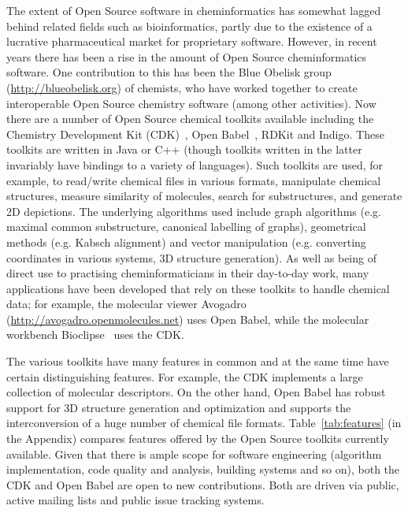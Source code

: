 \documentclass{sig-alternate}
\begin{document}
The extent of Open Source software in cheminformatics has somewhat
lagged behind related fields such as bioinformatics, partly due to the
existence of a lucrative pharmaceutical market for proprietary
software. However, in recent years there has been a rise in the amount
of Open Source cheminformatics software. One contribution to this has
been the Blue Obelisk group~\cite{BlueObelisk2011}
(\url{http://blueobelisk.org}) of chemists, who have worked together
to create interoperable Open Source chemistry software (among other
activities). Now there are a number of Open Source chemical toolkits
available including the Chemistry Development Kit
(CDK)~\cite{steinbeck2003}, Open Babel~\cite{openbabel2011}, RDKit and
Indigo. These toolkits are written in Java or C++ (though toolkits
written in the latter invariably have bindings to a variety of
languages). Such toolkits are used, for example, to read/write
chemical files in various formats, manipulate chemical structures, measure
similarity of molecules, search for substructures, and generate 2D
depictions. The underlying algorithms used include graph algorithms
(e.g. maximal common substructure, canonical labelling of graphs),
geometrical methods (e.g. Kabsch alignment) and vector manipulation
(e.g. converting coordinates in various systems, 3D structure
generation). As well as being of direct use to practising
cheminformaticians in their day-to-day work, many applications have
been developed that rely on these toolkits to handle chemical data;
for example, the molecular viewer Avogadro
(\url{http://avogadro.openmolecules.net}) uses Open Babel, while the
molecular workbench Bioclipse~\cite{Bioclipse2} uses the CDK.

The various toolkits have many features in common and at the same time
have certain distinguishing features. For example, the CDK implements
a large collection of molecular descriptors. On the other hand, Open
Babel has robust support for 3D structure generation and optimization
and supports the interconversion of a huge number of chemical file
formats. Table~\ref{tab:features} (in the Appendix) compares features
offered by the Open Source toolkits currently available.  Given that
there is ample scope for software engineering (algorithm
implementation, code quality and analysis, building systems and so on), both
the CDK and Open Babel are open to new contributions. Both are driven
via public, active mailing lists and public issue tracking systems.
\end{document}
